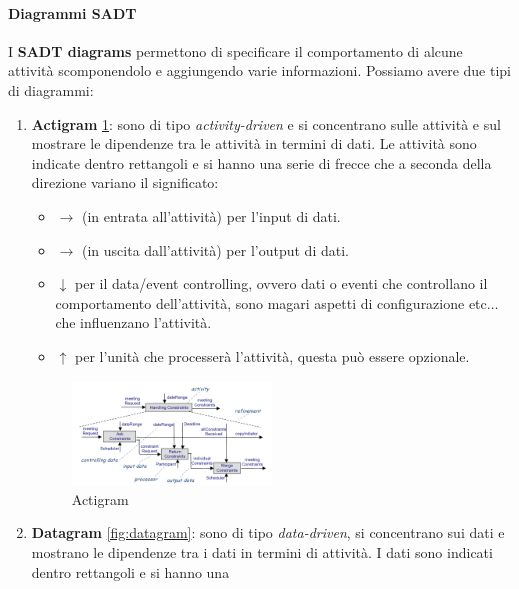 \paragraph{Diagrammi SADT}
I \textbf{SADT diagrams} permettono di specificare il comportamento di alcune
attività scomponendolo e aggiungendo varie informazioni. Possiamo avere due tipi
di diagrammi:
\begin{enumerate}
      \item \textbf{Actigram} \ref{fig:actigram}: sono di tipo \textit{activity-driven}
            e si concentrano sulle attività e sul mostrare le dipendenze tra le
            attività in termini di dati. Le attività sono indicate dentro
            rettangoli e si hanno una serie di frecce che a seconda della direzione
            variano il significato:
            \begin{itemize}
                  \item $\to$ (in entrata all'attività) per l'input di dati.
                  \item $\to$ (in uscita dall'attività) per l'output di dati.
                  \item $\downarrow$ per il data/event controlling, ovvero dati
                        o eventi che controllano il comportamento dell'attività,
                        sono magari aspetti di configurazione etc$\dots$ che
                        influenzano l'attività.
                  \item $\uparrow$ per l'unità che processerà l'attività, questa
                        può essere opzionale.
            \end{itemize}
            \begin{figure}[!ht]
                  \centering
                  \includegraphics[width = 0.5\textwidth]{img/requirements/actigram.png}
                  \caption{Actigram}
                  \label{fig:actigram}
            \end{figure}
      \item \textbf{Datagram} \ref{fig:datagram}: sono di tipo \textit{data-driven},
            si concentrano sui dati e mostrano le dipendenze tra i dati in termini
            di attività. I dati sono indicati dentro rettangoli e si hanno una

\end{enumerate}
